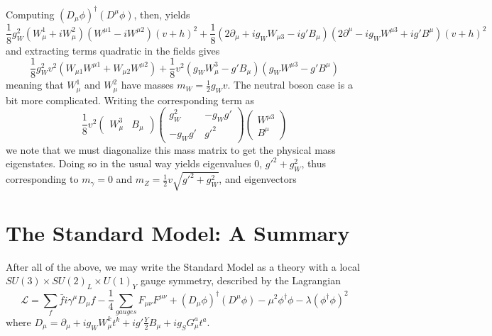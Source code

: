 Computing $(D_{\mu}\phi)^{\dagger}(D^{\mu}\phi)$, then, yields
\begin{equation}
\frac{1}{8}g_{W}^2(W_{\mu}^1+iW_{\mu}^2)(W^{\mu 1}-iW^{\mu 2})(v+h)^2 + 
\frac{1}{8}(2\partial_{\mu}+ig_{W}W_{\mu 3}-ig'B_{\mu})(2\partial^{\mu}-ig_{W}W^{\mu 3}+ig'B^{\mu})(v+h)^2
\end{equation}
and extracting terms quadratic in the fields gives
\begin{equation}
\frac{1}{8}g_{W}^2v^2(W_{\mu 1}W^{\mu 1}+W_{\mu 2}W^{\mu 2}) + \frac{1}{8}v^2(g_{W}W_{\mu}^3-g'B_{\mu})(g_{W}W^{\mu 3}-g'B^{\mu})
\end{equation}
meaning that $W_{\mu}^1$ and $W_{\mu}^2$ have masses $m_{W} = \frac{1}{2}g_{W}v$. The neutral boson case 
is a bit more complicated. Writing the corresponding term as
\begin{equation}
\frac{1}{8}v^2\begin{pmatrix}W_{\mu}^3&B_{\mu}\end{pmatrix} 
\begin{pmatrix}g_{W}^2 & -g_{W}g'\\-g_{W}g' & g'^2\end{pmatrix} 
\begin{pmatrix}W^{\mu 3}\\B^{\mu}\end{pmatrix}
\end{equation}
we note that we must diagonalize this mass matrix to get the physical mass eigenstates. Doing
so in the usual way yields eigenvalues $0$, $g'^2+g_{W}^2$, thus corresponding to $m_{\gamma} = 0$ 
and $m_{Z} =\frac{1}{2}v\sqrt{g'^2+g_{W}^2}$, and eigenvectors


\section{The Standard Model: A Summary}
After all of the above, we may write the Standard Model as a theory with a local $SU(3) \times SU(2)_{L} \times U(1)_{Y}$
gauge symmetry, described by the Lagrangian
\begin{equation}
\mathcal{L} = \sum\limits_{f} \bar{f}i\gamma^{\mu}D_{\mu}f -\frac{1}{4} \sum\limits_{gauges} F_{\mu\nu}F^{\mu\nu} +
 (D_{\mu}\phi)^{\dagger}(D^{\mu}\phi)-\mu^2\phi^{\dagger}\phi - \lambda(\phi^{\dagger}\phi)^2
\end{equation}
where $D_{\mu} = \partial_{\mu} + ig_{W}W_{\mu}^{k}t^{k} + ig'\frac{Y}{2}B_{\mu}+ig_{S}G_{\mu}^{a}t^{a}$.

